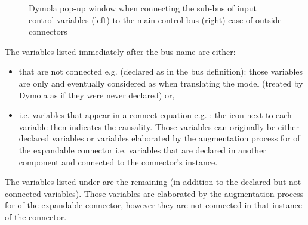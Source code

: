 \documentclass[letterpaper,10pt, openany,english]{sphinxmanual}
\begin{document}
\begin{figure}[htbp]
\centering
\capstart

\noindent{}
\caption{Dymola pop-up window when connecting the sub-bus of input control variables (left) to the main control bus (right) \textendash{} case of outside connectors}\label{\detokenize{requirements:dymola-bus}}\end{figure}

The variables listed immediately after the bus name are either:
\begin{itemize}
\item {} 
 that are not connected e.g.  (declared as  in the bus definition): those variables are only  and eventually considered as  when translating the model (treated by Dymola as if they were never declared) or,

\item {} 
 i.e. variables that appear in a connect equation e.g. : the icon next to each variable then indicates the causality. Those variables can originally be either declared variables or variables elaborated by the augmentation process for  of the expandable connector i.e. variables that are declared in another component and connected to the connector’s instance.

\end{itemize}

The variables listed under  are the remaining  (in addition to the declared but not connected variables). Those variables are elaborated by the augmentation process for  of the expandable connector, however they are not connected in that instance of the connector.
\end{document}
